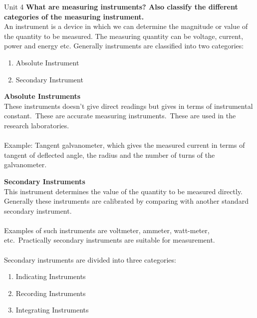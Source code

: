 \documentclass[11pt]{beamer}
\begin{document}
    \begin{frame}[allowframebreaks]{Unit 4}
        \textbf{\Large What are measuring instruments? Also classify the different categories of the measuring
        instrument.}~\\[10pt]

        An instrument is a device in which we can determine the magnitude or value of the quantity to be measured.
        The measuring quantity can be voltage, current, power and energy etc. Generally instruments are classified
        into two categories:

        \begin{enumerate}
            \item Absolute Instrument
            \item Secondary Instrument
        \end{enumerate}

        \framebreak

        \textbf{Absolute Instruments}\\[10pt]

        These instruments doesn't give direct readings but gives in terms of instrumental constant.\ These are
        accurate measuring instruments.\ These are used in the research laboratories.
        \\~\\
        Example: Tangent galvanometer, which gives the measured current in terms of tangent of deflected angle, the
        radius and the number of turns of the galvanometer.

        \framebreak

        \textbf{Secondary Instruments}\\[10pt]

        This instrument determines the value of the quantity to be measured directly. Generally these instruments are
        calibrated by comparing with another standard secondary instrument.
        \\~\\
        Examples of such instruments are voltmeter, ammeter, watt-meter, etc.\ Practically secondary instruments are
        suitable for measurement.
        \\~\\
        Secondary instruments are divided into three categories:
        \begin{enumerate}
            \item Indicating Instruments
            \item Recording Instruments
            \item Integrating Instruments
        \end{enumerate}


\end{frame}
\end{document}
